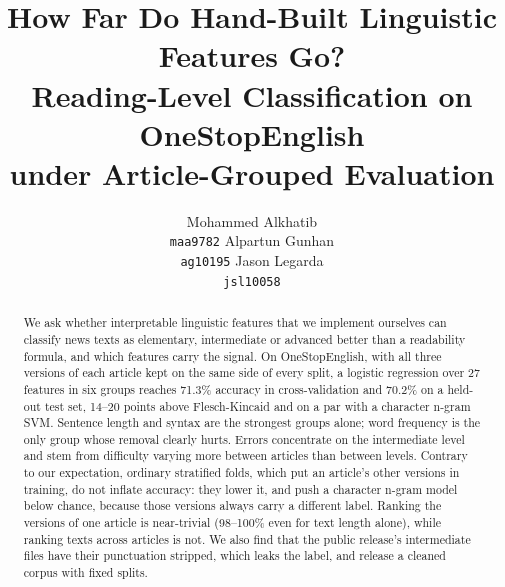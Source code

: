 \documentclass[11pt]{article}
\title{How Far Do Hand-Built Linguistic Features Go?\\Reading-Level Classification on OneStopEnglish\\under Article-Grouped Evaluation}
\author{Mohammed Alkhatib \\ \texttt{maa9782} \And
        Alpartun Gunhan \\ \texttt{ag10195} \And
        Jason Legarda \\ \texttt{jsl10058}}
\begin{document}
\maketitle

\begin{abstract}
We ask whether interpretable linguistic features that we implement ourselves can classify news texts as elementary, intermediate or advanced better than a readability formula, and which features carry the signal. On OneStopEnglish, with all three versions of each article kept on the same side of every split, a logistic regression over 27 features in six groups reaches 71.3\% accuracy in cross-validation and 70.2\% on a held-out test set, 14--20 points above Flesch-Kincaid and on a par with a character n-gram SVM. Sentence length and syntax are the strongest groups alone; word frequency is the only group whose removal clearly hurts. Errors concentrate on the intermediate level and stem from difficulty varying more between articles than between levels. Contrary to our expectation, ordinary stratified folds, which put an article's other versions in training, do not inflate accuracy: they lower it, and push a character n-gram model below chance, because those versions always carry a different label. Ranking the versions of one article is near-trivial (98--100\% even for text length alone), while ranking texts across articles is not. We also find that the public release's intermediate files have their punctuation stripped, which leaks the label, and release a cleaned corpus with fixed splits.
\end{abstract}







\end{document}
